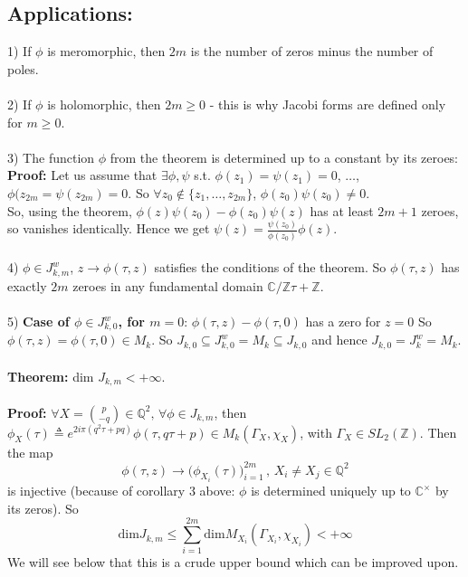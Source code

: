 \documentclass[10pt,a4paper]{article}
\begin{document}
\subsection{Applications:}
1) If $\phi$ is meromorphic, then $2m$ is the number of zeros minus the number of poles.\\
\\
2) If $\phi$ is holomorphic, then $2m\geq0$ - this is why Jacobi forms are defined only for $m\geq0$.\\
\\
3) The function $\phi$ from the theorem is determined up to a constant by its zeroes:\\
\textbf{Proof:} Let us assume that $\exists\phi, \psi$ s.t. $\phi(z_1)=\psi(z_1)=0$, $\ldots$, $\phi(z_{2m}=\psi(z_{2m})=0$. So $\forall z_0\notin\{z_1,\ldots,z_{2m}\}$, $\phi(z_0)\psi(z_0)\neq0$.\\
So, using the theorem, $\phi(z)\psi(z_0)-\phi(z_0)\psi(z)$ has at least $2m+1$ zeroes, so vanishes identically. Hence we get $\psi(z)=\frac{\psi(z_0)}{\phi(z_0)}\phi(z)$.
\\
\\
4) $\phi\in J_{k,m}^w$, $z\rightarrow\phi(\tau,z)$ satisfies the conditions of the theorem. So $\phi(\tau,z)$ has exactly $2m$ zeroes in any fundamental domain 
$\mathbb{C}/\mathbb{Z}\tau+\mathbb{Z}$.\\
\\
5) \textbf{Case of $\phi\in J_{k,0}^w$, for $m=0$}: $\phi(\tau,z)-\phi(\tau,0)$ has a zero for $z=0$ So $\phi(\tau,z)=\phi(\tau,0)\in M_k$. So
$J_{k,0}\subseteq J_{k,0}^w=M_k\subseteq J_{k,0}$ and hence $J_{k,0}=J_k^w=M_k$.
\\
\\
\textbf{Theorem: } dim $J_{k,m}<+\infty$.
\\
\\
\textbf{Proof: }
$\forall X=\binom{p}{-q}\in\mathbb{Q}^2,\,\forall\phi\in J_{k,m}$, then $\phi_X(\tau)\triangleq e^{2i\pi(q^2\tau+pq)}\phi(\tau,q\tau+p)\in M_k(\Gamma_X,\chi_X)$, with $\Gamma_X\in SL_2(\mathbb{Z})$. Then the map
\[\phi(\tau,z)\rightarrow\big(\phi_{X_i}(\tau)\big)_{i=1}^{2m}\,,\,X_i\neq X_j\in\mathbb{Q}^2\]
is injective (because of corollary 3 above: $\phi$ is determined uniquely up to $\mathbb{C}^\times$ by its zeros).
So 
\[\textrm{dim}J_{k,m}\leq\sum_{i=1}^{2m}\textrm{dim} M_{X_i}(\Gamma_{X_i},\chi_{X_i})<+\infty\]
We will see below that this is a crude upper bound which can be improved upon.
\end{document}
